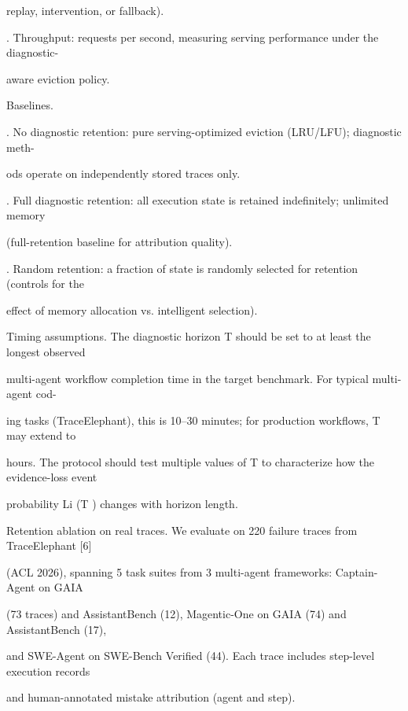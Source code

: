 \begin{flushleft}
\noindent  replay, intervention, or fallback).\par
{}. Throughput: requests per second, measuring serving performance under the diagnostic-\par
\noindent  aware eviction policy.\par
\par\smallskip
\noindent Baselines.\par
{}. No diagnostic retention: pure serving-optimized eviction (LRU/LFU); diagnostic meth-\par
\noindent  ods operate on independently stored traces only.\par
{}. Full diagnostic retention: all execution state is retained indefinitely; unlimited memory\par
\noindent  (full-retention baseline for attribution quality).\par
{}. Random retention: a fraction of state is randomly selected for retention (controls for the\par
\noindent  effect of memory allocation vs. intelligent selection).\par
\par\smallskip
\noindent Timing assumptions. The diagnostic horizon T should be set to at least the longest observed\par
\noindent multi-agent workflow completion time in the target benchmark. For typical multi-agent cod-\par
\noindent ing tasks (TraceElephant), this is 10–30 minutes; for production workflows, T may extend to\par
\noindent hours. The protocol should test multiple values of T to characterize how the evidence-loss event\par
\noindent probability Li (T ) changes with horizon length.\par
\par\smallskip
\noindent Retention ablation on real traces. We evaluate on 220 failure traces from TraceElephant [6]\par
\noindent (ACL 2026), spanning 5 task suites from 3 multi-agent frameworks: Captain-Agent on GAIA\par
\noindent (73 traces) and AssistantBench (12), Magentic-One on GAIA (74) and AssistantBench (17),\par
\noindent and SWE-Agent on SWE-Bench Verified (44). Each trace includes step-level execution records\par
\noindent and human-annotated mistake attribution (agent and step).\par

\end{flushleft}
